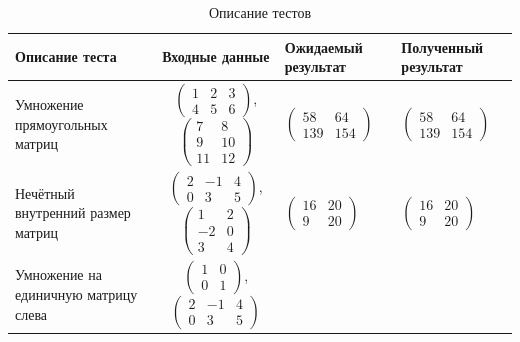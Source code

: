 \documentclass{bmstu}
\begin{document}
\begin{table}[H]
	\centering
	\caption{Описание тестов}
	\label{tab:tests}
	\begin{tabularx}{\textwidth}{|p{3.5cm}|c|C|C|}
		\hline
		Описание теста & Входные данные                               & Ожидаемый результат &
		Полученный результат                                                                  \\ \hline
		Умножение прямоугольных матриц
		               & $\begin{pmatrix}1&2&3\\4&5&6\end{pmatrix}$,
		$\begin{pmatrix}7&8\\9&10\\11&12\end{pmatrix}$
		               & $\begin{pmatrix}58&64\\139&154\end{pmatrix}$
		               & $\begin{pmatrix}58&64\\139&154\end{pmatrix}$                         \\ \hline
		Нечётный внутренний размер матриц
		               & $\begin{pmatrix}2&-1&4\\0&3&5\end{pmatrix}$,
		$\begin{pmatrix}1&2\\-2&0\\3&4\end{pmatrix}$
		               & $\begin{pmatrix}16&20\\9&20\end{pmatrix}$
		               & $\begin{pmatrix}16&20\\9&20\end{pmatrix}$                            \\ \hline
		Умножение на единичную матрицу слева
		               & $\begin{pmatrix}1&0\\0&1\end{pmatrix}$,
		$\begin{pmatrix}2&-1&4\\0&3&5\end{pmatrix}$

\end{tabularx}
\end{table}
\end{document}
